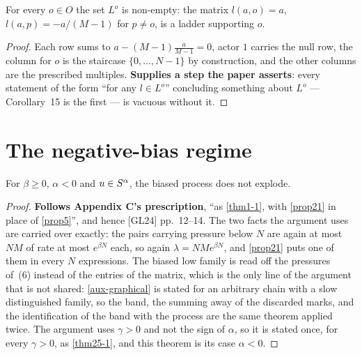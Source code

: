 \begin{lemma}
  \label{aux-ladder-nonempty}
  \leanok
  For every $o \in O$ the set $L^o$ is non-empty: the matrix
  $l(a, o) = a$, $l(a, p) = -a/(M-1)$ for $p \ne o$, is a ladder supporting
  $o$.
\end{lemma}
\begin{proof}
  \leanok
  Each row sums to $a - (M-1)\tfrac{a}{M-1} = 0$, actor $1$ carries the null
  row, the column for $o$ is the staircase $\{0, \dots, N-1\}$ by
  construction, and the other columns are the prescribed multiples.
  \textbf{Supplies a step the paper asserts}: every statement of the form
  ``for any $l \in L^o$'' concluding something about $L^o$ --- Corollary~15
  is the first --- is vacuous without it.
\end{proof}

\section{The negative-bias regime}

\begin{theorem}
  \label{thm16}
  \leanok
  For $\beta \ge 0$, $\alpha < 0$ and $u \in S^\alpha$, the biased process does
  not explode.
\end{theorem}
\begin{proof}
  \leanok
  \textbf{Follows Appendix C's prescription}, ``as \ref{thm1-1}, with \ref{prop21} in place of
  \ref{prop5}'', and hence [GL24] pp.~12--14.  The two facts the argument uses are carried over
  exactly: the pairs carrying pressure below $N$ are again at most $NM$ of rate at most
  $e^{\beta N}$ each, so again $\lambda = NMe^{\beta N}$, and \ref{prop21} puts one of them in
  every $N$ expressions.  The biased low family is read off the pressures of~(6) instead of the
  entries of the matrix, which is the only line of the argument that is not shared:
  \ref{aux-graphical} is stated for an arbitrary chain with a slow distinguished family, so the
  band, the summing away of the discarded marks, and the identification of the band with the
  process are the same theorem applied twice.  The argument uses $\gamma > 0$ and not the sign
  of $\alpha$, so it is stated once, for every $\gamma > 0$, as \ref{thm25-1}, and this
  theorem is its case $\alpha < 0$.
\end{proof}

